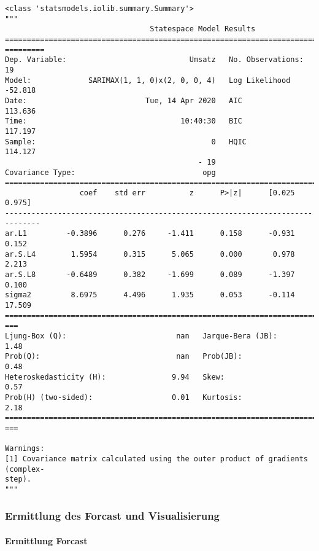 \documentclass[paper=landscape]{scrartcl}
\makeatletter
\newcommand{\boxspacing}{\kern\kvtcb@left@rule\kern\kvtcb@boxsep}
\newcommand{\prompt}[4]{
        \ttfamily\llap{{\color{#2}[#3]:\hspace{3pt}#4}}\vspace{-\baselineskip}
    }
\makeatother
\begin{document}
            \begin{tcolorbox}[breakable, size=fbox, boxrule=.5pt, pad at break*=1mm, opacityfill=0]
\prompt{Out}{outcolor}{14}{\boxspacing}
\begin{Verbatim}[commandchars=\\\{\}]
<class 'statsmodels.iolib.summary.Summary'>
"""
                                 Statespace Model Results
================================================================================
=========
Dep. Variable:                            Umsatz   No. Observations:
19
Model:             SARIMAX(1, 1, 0)x(2, 0, 0, 4)   Log Likelihood
-52.818
Date:                           Tue, 14 Apr 2020   AIC
113.636
Time:                                   10:40:30   BIC
117.197
Sample:                                        0   HQIC
114.127
                                            - 19
Covariance Type:                             opg
==============================================================================
                 coef    std err          z      P>|z|      [0.025      0.975]
------------------------------------------------------------------------------
ar.L1         -0.3896      0.276     -1.411      0.158      -0.931       0.152
ar.S.L4        1.5954      0.315      5.065      0.000       0.978       2.213
ar.S.L8       -0.6489      0.382     -1.699      0.089      -1.397       0.100
sigma2         8.6975      4.496      1.935      0.053      -0.114      17.509
================================================================================
===
Ljung-Box (Q):                         nan   Jarque-Bera (JB):
1.48
Prob(Q):                               nan   Prob(JB):
0.48
Heteroskedasticity (H):               9.94   Skew:
0.57
Prob(H) (two-sided):                  0.01   Kurtosis:
2.18
================================================================================
===

Warnings:
[1] Covariance matrix calculated using the outer product of gradients (complex-
step).
"""
\end{Verbatim}
\end{tcolorbox}
        
    \hypertarget{ermittlung-des-forcast-und-visualisierung}{%
\subsubsection{Ermittlung des Forcast und
Visualisierung}\label{ermittlung-des-forcast-und-visualisierung}}

\hypertarget{ermittlung-forcast}{%
\paragraph{Ermittlung Forcast}\label{ermittlung-forcast}}
\end{document}
